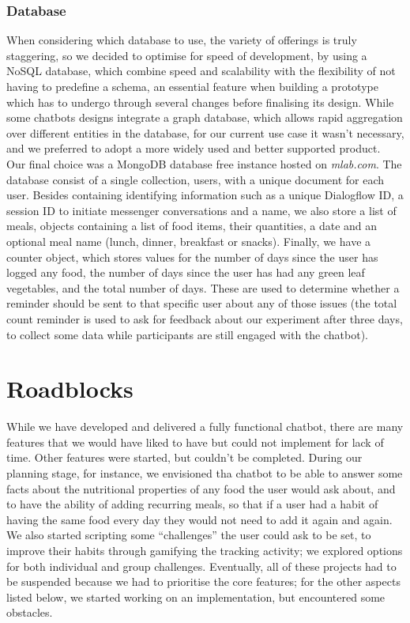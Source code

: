 \subsubsection{Database}
When considering which database to use, the variety of offerings is truly staggering, so we decided to optimise for speed of development, by using a NoSQL database, which combine speed and scalability with the flexibility of not having to predefine a schema, an essential feature when building a prototype which has to undergo through several changes before finalising its design. While some chatbots designs integrate a graph database, which allows rapid aggregation over different entities in the database, for our current use case it wasn't necessary, and we preferred to adopt a more widely used and better supported product.\\
Our final choice was a MongoDB database free instance hosted on \textit{mlab.com}. The database consist of a single collection, users, with a unique document for each user. Besides containing identifying information such as a unique Dialogflow ID, a session ID to initiate messenger conversations and a name, we also store a list of meals, objects containing a list of food items, their quantities, a date and an optional meal name (lunch, dinner, breakfast or snacks). Finally, we have a counter object, which stores values for the number of days since the user has logged any food, the number of days since the user has had any green leaf vegetables, and the total number of days. These are used to determine whether a reminder should be sent to that specific user about any of those issues (the total count reminder is used to ask for feedback about our experiment after three days, to collect some data while participants are still engaged with the chatbot).
\section{Roadblocks}
While we have developed and delivered a fully functional chatbot, there are many features that we would have liked to have but could not implement for lack of time. Other features were started, but couldn't be completed. During our planning stage, for instance, we envisioned tha chatbot to be able to answer some facts about the nutritional properties of any food the user would ask about, and to have the ability of adding recurring meals, so that if a user had a habit of having the same food every day they would not need to add it again and again. We also started scripting some ``challenges'' the user could ask to be set, to improve their habits through gamifying the tracking activity; we explored options for both individual and group challenges. Eventually, all of these projects had to be suspended because we had to prioritise the core features; for the other aspects listed below, we started working on an implementation, but encountered some obstacles. 
